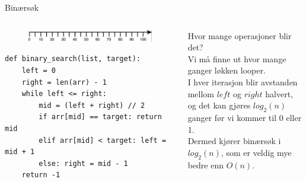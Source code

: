 \begin{frame}[fragile]{Binærsøk}
    \begin{columns}
        \begin{column}{0.50\textwidth}
            \begin{figure}
                \centering
                \includegraphics[scale=0.3]{images/Tallinje.png}
                \label{fig:tall}
            \end{figure}  
            \pause
            \begin{verbatim}
def binary_search(list, target):
    left = 0
    right = len(arr) - 1
    while left <= right:
        mid = (left + right) // 2
        if arr[mid] == target: return mid
        elif arr[mid] < target: left = mid + 1
        else: right = mid - 1
    return -1
            \end{verbatim}       
        \end{column}
        \begin{column}{0.47\textwidth}
            Hvor mange operasjoner blir det?\\\pause
            Vi må finne ut hvor mange ganger løkken looper.\\\pause
            I hver iterasjon blir avstanden mellom $left$ og $right$ halvert, og det kan gjøres $log_2(n)$ ganger før vi kommer til 0 eller 1.\\[2mm]\pause
            Dermed kjører binærsøk i $log_2(n)$, som er veldig mye bedre enn $O(n)$.
        \end{column}
    \end{columns}
\end{frame}